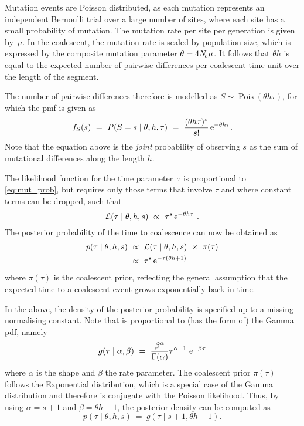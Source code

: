Mutation events are Poisson distributed, as each mutation represents an independent Bernoulli trial over a large number of sites, where each site has a small probability of mutation.
The mutation rate per site per generation is given by~$\mu$.
In the coalescent, the mutation rate is scaled by population size, which is expressed by the composite mutation parameter ${\theta = 4N_{\!e}\mu}$.
It follows that ${\theta h}$ is equal to the expected number of pairwise differences per coalescent time unit over the length of the segment.

The number of pairwise differences therefore is modelled as ${S \sim \operatorname{Pois}(\theta h \tau)}$, for which the \gls{pmf} is given as
\begin{equation}\label{eq:mut_prob}
	f_S(s)~=~P(S=s \mid \theta,h,\tau) ~=~ \frac{(\theta h \tau)^s}{s!} \,\mathrm{e}^{-\theta h \tau}\text{.}
\end{equation}
Note that the equation above is the \emph{joint} probability of observing $s$ as the sum of mutational differences along the length $h$.

The likelihood function for the time parameter~$\tau$ is proportional to \cref{eq:mut_prob}, but requires only those terms that involve $\tau$ and where constant terms can be dropped, such that
\begin{equation}\label{eq:mut_like}
	\mathcal{L}(\tau \mid \theta,h,s) ~\propto~ \tau^s \,\mathrm{e}^{-\theta h \tau}\ .
\end{equation}
The posterior probability of the time to coalescence can now be obtained as
\begin{equation}\label{eq:mut_post}
\begin{split}
	p(\tau \mid \theta,h,s)
	&~\propto~ \mathcal{L}(\tau \mid \theta,h,s)~\times~\pi(\tau) \\
	&~\propto~ \tau^s \,\mathrm{e}^{- \tau (\theta h +1)}
\end{split}
\end{equation}
where $\pi(\tau)$ is the coalescent prior, reflecting the general assumption that the expected time to a coalescent event grows exponentially back in time.

In the above, the density of the posterior probability is specified up to a missing normalising constant.
Note that  is proportional to (has the form of) the Gamma \gls{pdf}, namely
\begin{equation*}
	g(\tau\mid\alpha,\beta)~=~\frac{\beta^\alpha}{\Gamma(\alpha)}\tau^{\alpha - 1}\,\,\mathrm{e}^{-\beta\tau}
\end{equation*}
where $\alpha$ is the shape and $\beta$ the rate parameter.
The coalescent prior $\pi(\tau)$ follows the Exponential distribution, which is a special case of the Gamma distribution and therefore is conjugate with the Poisson likelihood.
Thus, by using ${\alpha = s+1}$ and ${\beta = \theta h+1}$, the posterior density can be computed as
\begin{equation}
	p(\tau \mid \theta,h,s)~=~g(\tau\mid s+1, \theta h+1)\text{.}
\end{equation}




